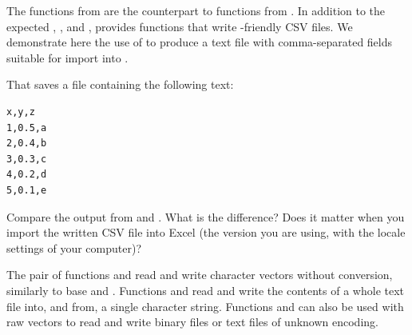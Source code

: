\documentclass[krantz2]{krantz}\usepackage{knitr}
\begin{document}
The  functions from  are the counterpart to  functions from . In addition to the expected , ,  and ,  provides functions that write -friendly CSV files. We demonstrate here the use of  to produce a text file with comma-separated fields suitable for import into .

\begin{knitrout}\footnotesize
{}\color{fgcolor}\begin{kframe}
\begin{alltt}
  \hlstd{=} \hlstd{)}
\hlstd{(}\hlstd{,}  \hlstd{=} \hlstd{)}
\end{alltt}
\end{kframe}
\end{knitrout}

That saves a file containing the following text:
\begin{knitrout}\footnotesize
{}\color{fgcolor}\begin{kframe}
\begin{verbatim}
x,y,z
1,0.5,a
2,0.4,b
3,0.3,c
4,0.2,d
5,0.1,e
\end{verbatim}
\end{kframe}
\end{knitrout}

\begin{playground}
Compare the output from  and . What is the difference? Does it matter when you import the written CSV file into Excel (the version you are using, with the locale settings of your computer)?
\end{playground}

The pair of functions  and  read and write character vectors without conversion, similarly to base \Rlang {} and . Functions  and  read and write the contents of a whole text file into, and from, a single character string. Functions  and  can also be used with raw vectors to read and write binary files or text files of unknown encoding.
\end{document}
